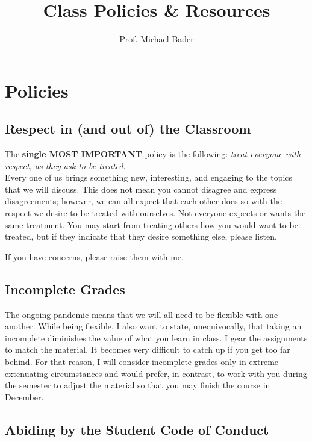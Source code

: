\documentclass[10pt]{homework}
\title{Class Policies \& Resources}
\author{Prof. Michael Bader}
\begin{document}
\maketitle 

\vspace{-3em}
\section{Policies} 

\subsection{Respect in (and out of) the Classroom}

The \textbf{single MOST IMPORTANT} policy is the following: \emph{treat everyone with respect, as they ask to be treated}.\\[0.25\baselineskip]

Every one of us brings something new, interesting, and engaging to the topics that we will discuss. This does not mean you cannot disagree and express disagreements; however, we can all expect that each other does so with the respect we desire to be treated with ourselves. Not everyone expects or wants the same treatment. You may start from treating others how you would want to be treated, but if they indicate that they desire something else, please listen. 

If you have concerns, please raise them with me. 

\subsection{Incomplete Grades}

The ongoing pandemic means that we will all need to be flexible with one another. While being flexible, I also want to state, unequivocally, that taking an incomplete diminishes the value of what you learn in class. I gear the assignments to match the material. It becomes very difficult to catch up if you get too far behind. For that reason, I will consider incomplete grades only in extreme extenuating circumstances and would prefer, in contrast, to work with you during the semester to adjust the material so that you may finish the course in December.

\subsection{Abiding by the Student Code of Conduct}
\end{document}
